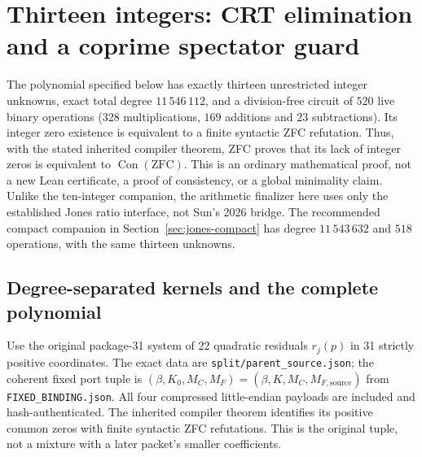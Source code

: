 \section{Thirteen integers: CRT elimination and a coprime spectator guard}
\label{sec:jones-seeded}

The polynomial specified below has exactly thirteen unrestricted integer
unknowns, exact total degree $11\,546\,112$, and a division-free circuit of
$520$ live binary operations ($328$ multiplications, $169$ additions and
$23$ subtractions). Its integer zero existence is equivalent to a finite
syntactic ZFC refutation. Thus, with the stated inherited compiler theorem,
ZFC proves that its lack of integer zeros is equivalent to
$\operatorname{Con}(\mathrm{ZFC})$. This is an ordinary mathematical proof,
not a new Lean certificate, a proof of consistency, or a global minimality
claim. Unlike the ten-integer companion, the arithmetic finalizer here uses
only the established Jones ratio interface, not Sun's 2026 bridge. The recommended compact companion in Section~\ref{sec:jones-compact} has degree $11\,543\,632$ and $518$ operations, with the same thirteen unknowns.

\subsection{Degree-separated kernels and the complete polynomial}
Use the original package-31 system of 22 quadratic residuals
$r_j(p)$ in 31 strictly positive coordinates. The exact data are
\texttt{split/parent\_source.json}; the coherent fixed port tuple is
$(\beta,K_0,M_C,M_F)=(\beta,K,M_C,M_{F,\mathrm{source}})$ from
\texttt{FIXED\_BINDING.json}. All four compressed little-endian payloads are
included and hash-authenticated. The inherited compiler theorem identifies
its positive common zeros with finite syntactic ZFC refutations. This is the
original tuple, not a mixture with a later packet's smaller coefficients.

